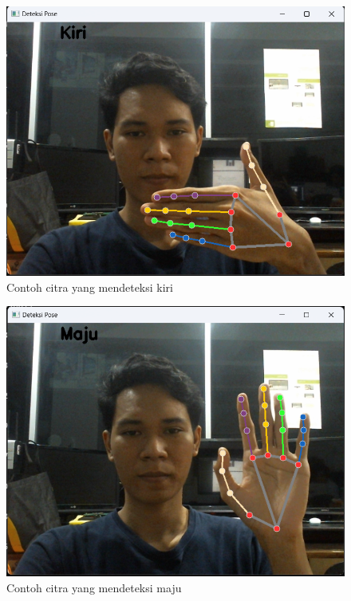 \begin{figure} [h] \centering
  \includegraphics[scale=0.48]{gambar/bab3/Kiri.png}
  \caption{Contoh citra yang mendeteksi kiri}
  \label{fig:klasifikasi kiri}
\end{figure}

\newpage

\begin{figure} [h] \centering
  \includegraphics[scale=0.473]{gambar/bab3/Maju.png}
  \caption{Contoh citra yang mendeteksi maju}
  \label{fig:klasifikasi maju}
\end{figure}

